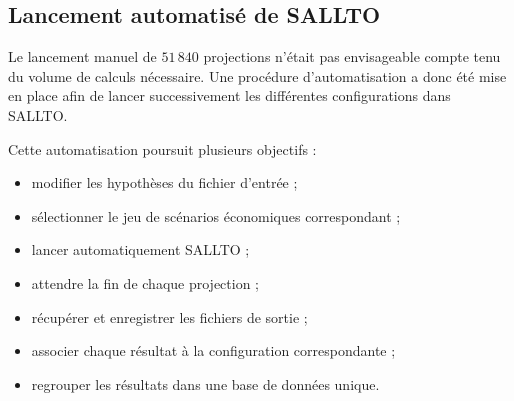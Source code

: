 
\subsection{Lancement automatisé de SALLTO}

Le lancement manuel de \(51\,840\) projections n'était pas envisageable compte tenu du volume de calculs nécessaire. Une procédure d'automatisation a donc été mise en place afin de lancer successivement les différentes configurations dans SALLTO.

Cette automatisation poursuit plusieurs objectifs :

\begin{itemize}
    \item modifier les hypothèses du fichier d'entrée ;
    \item sélectionner le jeu de scénarios économiques correspondant ;
    \item lancer automatiquement SALLTO ;
    \item attendre la fin de chaque projection ;
    \item récupérer et enregistrer les fichiers de sortie ;
    \item associer chaque résultat à la configuration correspondante ;
    \item regrouper les résultats dans une base de données unique.
\end{itemize}

